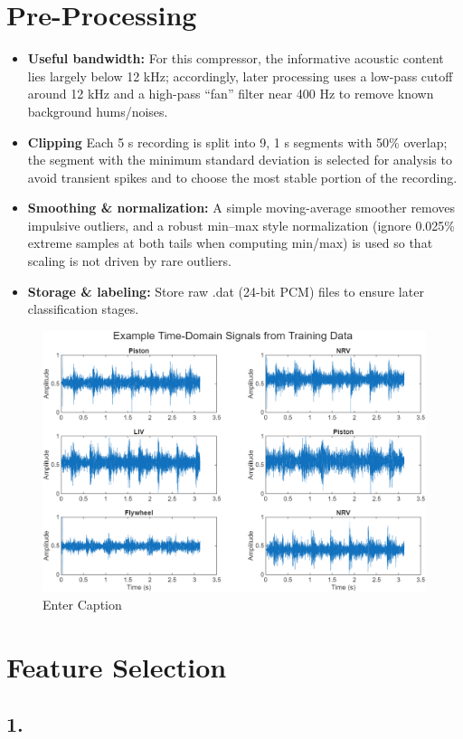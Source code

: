 \documentclass[12pt,a4paper]{article}
\begin{document}
\begin{multicols}{2}
\section{Pre-Processing}
\begin{itemize}
  \item \textbf{Useful bandwidth:} For this compressor, the informative acoustic content lies largely below 12 kHz; accordingly, later processing uses a low-pass cutoff around 12 kHz and a high-pass ``fan'' filter near 400 Hz to remove known background hums/noises.
  \item \textbf{Clipping} Each 5 s recording is split into 9, 1 s segments with 50\% overlap; the segment with the minimum standard deviation is selected for analysis to avoid transient spikes and to choose the most stable portion of the recording.
  \item \textbf{Smoothing \& normalization:} A simple moving-average smoother removes impulsive outliers, and a robust min–max style normalization (ignore 0.025\% extreme samples at both tails when computing min/max) is used so that scaling is not driven by rare outliers.
  \item \textbf{Storage \& labeling:} Store raw .dat (24-bit PCM) files to ensure later classification stages.
\end{itemize}
\begin{figure}[H]
    \centering
    \includegraphics[width=0.85\linewidth]{preprocessing.png}
    \caption{Enter Caption}
    \label{fig:placeholder}
\end{figure}
\section{Feature Selection}
\subsection{1.}

\end{multicols}
\end{document}
